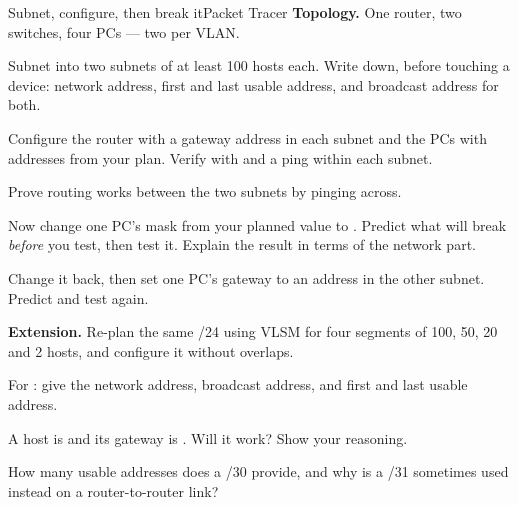 \begin{lab}{Subnet, configure, then break it}{Packet Tracer}
\textbf{Topology.} One router, two switches, four PCs --- two per VLAN.

\begin{tasks}
  \item Subnet  into two subnets of at least 100 hosts each.
        Write down, before touching a device: network address, first and last
        usable address, and broadcast address for both.
  \item Configure the router with a gateway address in each subnet and the PCs
        with addresses from your plan. Verify with 
        and a ping within each subnet.
  \item Prove routing works between the two subnets by pinging across.
  \item Now change one PC's mask from your planned value to
        . Predict what will break \emph{before} you test, then
        test it. Explain the result in terms of the network part.
  \item Change it back, then set one PC's gateway to an address in the other
        subnet. Predict and test again.
  \item \textbf{Extension.} Re-plan the same /24 using VLSM for four segments of
        100, 50, 20 and 2 hosts, and configure it without overlaps.
\end{tasks}
\end{lab}

\begin{checkpoint}
\begin{tightnum}
  \item For : give the network address, broadcast address,
        and first and last usable address.
  \item A host is  and its gateway is
        . Will it work? Show your reasoning.
  \item How many usable addresses does a /30 provide, and why is a /31 sometimes
        used instead on a router-to-router link?
\end{tightnum}
\end{checkpoint}

